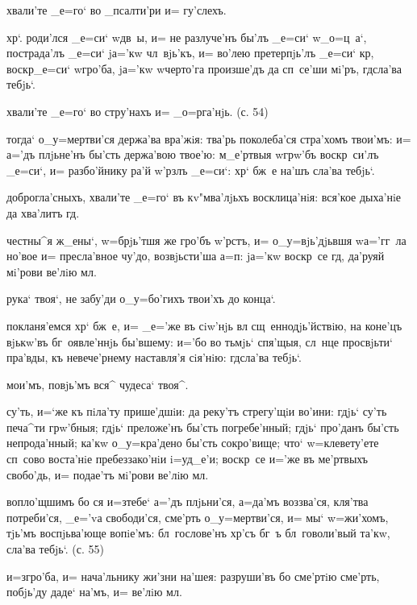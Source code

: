 хвали'те _е=го` во _псалти'ри и= гу'слехъ.

хр`. роди'лся _е=си` w\т дв~ы, и= не разлуче'нъ бы'лъ 
_е=си` w\т _о=ц~а`, пострада'лъ _е=си` jа='кw чл~вjь'къ, 
и= во'лею претерпjь'лъ _е=си` кр, воскр _е=си` 
w\т гро'ба, jа='кw w\т черто'га произше'дъ да сп~се'ши 
мi'ръ, гд сла'ва тебjь`.


хвали'те _е=го` во стру'нахъ и= _о=рга'нjь. (с. 54)

тогда` о_у=мертви'ся держа'ва вра'жiя: тва'рь поколеба'ся 
стра'хомъ твои'мъ: и= а='дъ плjьне'нъ бы'сть держа'вою 
твое'ю: м_е'ртвыя w\т грw'бъ воскр~си'лъ _е=си`, и= 
разбо'йнику ра'й w'рзлъ _е=си`: хр` бж~е на'шъ 
сла'ва тебjь`.

доброгла'сныхъ, хвали'те _е=го` въ кv"мва'лjьхъ 
восклица'нiя: вся'кое дыха'нiе да хва'литъ гд.

честны^я ж_ены`, w=брjь'тшя же гро'бъ w'рстъ, и= 
о_у=вjь'дjьвшя w\т а='гг~ла но'вое и= пресла'вное чу'до, 
возвjьсти'ша а=п: jа='кw воскр~се гд, да'руяй 
мi'рови ве'лiю мл.

рука` твоя`, не забу'ди о_у=бо'гихъ твои'хъ до конца`.

покланя'емся хр` бж~е, и= _е='же въ сiw'нjь вл 
сщ~еннодjь'йствiю, на коне'цъ вjькw'въ бг~оявле'ннjь 
бы'вшему: и='бо во тьмjь` спя'щыя, сл~нце просвjьти` 
пра'вды, къ невече'рнему наставля'я сiя'нiю: гд сла'ва 
тебjь`.

мои'мъ, повjь'мъ вся^ чудеса` твоя^.

су'ть, и=`же къ пiла'ту прише'дшiи: да реку'тъ стрегу'щiи 
во'ини: гдjь` су'ть печа^ти грw'бныя; гдjь` преложе'нъ 
бы'сть погребе'нный; гдjь` про'данъ бы'сть непрода'нный; 
ка'кw о_у=кра'дено бы'сть сокро'вище; что` w=клевету'ете 
сп~сово воста'нiе пребеззако'нiи i=уд_е'и; воскр~се и='же 
въ ме'ртвыхъ свобо'дь, и= подае'тъ мi'рови ве'лiю мл.


вопло'щшимъ бо ся и=з\ъ тебе` а='дъ плjьни'ся, а=да'мъ 
воззва'ся, кля'тва потреби'ся, _е='vа свободи'ся, сме'рть 
о_у=мертви'ся, и= мы` w=жи'хомъ, тjь'мъ воспjьва'юще 
вопiе'мъ: бл~гослове'нъ хр'съ бг~ъ бл~говоли'вый 
та'кw, сла'ва тебjь`. (с. 55)


и=з\ъ гро'ба, и= нача'льнику жи'зни на'шея: разруши'въ бо 
сме'ртiю сме'рть, побjь'ду даде` на'мъ, и= ве'лiю мл.

